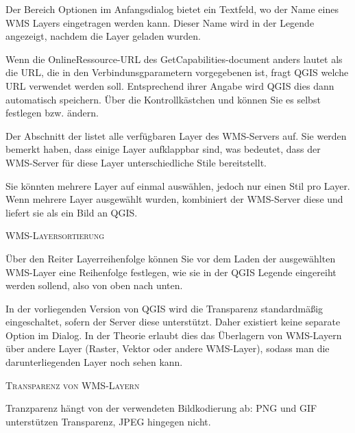 
Der Bereich Optionen im Anfangsdialog bietet ein Textfeld, wo der Name eines 
WMS Layers eingetragen werden kann. Dieser Name wird in der Legende angezeigt, 
nachdem die Layer geladen wurden.

Wenn die OnlineRessource-URL des GetCapabilities-document anders lautet als die 
URL, die in den Verbindunsgparametern vorgegebenen ist, fragt QGIS welche URL 
verwendet werden soll. Entsprechend ihrer Angabe wird QGIS dies dann automatisch 
speichern. Über die Kontrollkästchen  und 
 können Sie es selbst festlegen bzw. ändern.  

\label{ogc-wms-layers}

Der Abschnitt der  listet alle verfügbaren Layer des
WMS-Servers auf.
Sie werden bemerkt haben, dass einige Layer aufklappbar sind, was bedeutet,
dass der WMS-Server für diese Layer unterschiedliche Stile bereitstellt.

Sie könnten mehrere Layer auf einmal auswählen, jedoch nur einen Stil pro
Layer. Wenn mehrere Layer ausgewählt wurden, kombiniert der WMS-Server diese
und liefert sie als ein Bild an QGIS.

\begin{Tip}[h]\caption{\textsc{WMS-Layersortierung}}
Über den Reiter Layerreihenfolge können Sie vor dem Laden der 
ausgewählten WMS-Layer eine Reihenfolge festlegen, wie sie in der QGIS Legende 
eingereiht werden sollend, also von oben nach unten.
\end{Tip}

\label{ogc-wms-transparency}

In der vorliegenden Version von QGIS wird die Transparenz standardmäßig
eingeschaltet, sofern der Server diese unterstützt. Daher existiert keine
separate Option im Dialog. In der Theorie erlaubt dies das Überlagern von
WMS-Layern über andere Layer (Raster, Vektor oder andere WMS-Layer), sodass
man die darunterliegenden Layer noch sehen kann.

\begin{Tip}[h]\caption{\textsc{Transparenz von WMS-Layern}}
Tranzparenz hängt von der verwendeten Bildkodierung ab: PNG und GIF
unterstützen Transparenz, JPEG hingegen nicht. 
\end{Tip}


